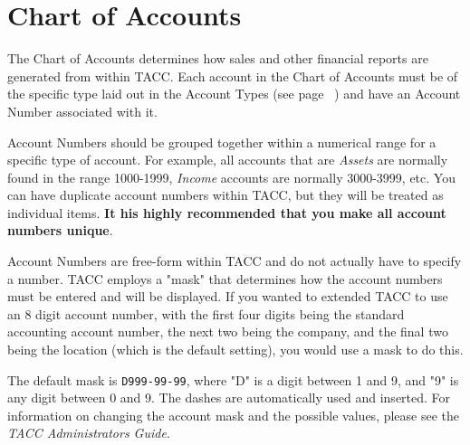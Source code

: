 \chapter{Chart of Accounts}
\label{Chart of Accounts}
The Chart of Accounts determines how sales and other financial reports
are generated from within TACC.  Each account in the Chart of Accounts
must be of the specific type laid out in the Account Types (see page
~\pageref{QuickStartAccountTypes}) and have an Account Number associated
with it.

Account Numbers should be grouped together within a numerical range for
a specific type of account.  For example, all accounts that are
\emph{Assets} are normally found in the range 1000-1999, \emph{Income}
accounts are normally 3000-3999, etc.  You can have duplicate account
numbers within TACC, but they will be treated as individual items.
{\bf It his highly recommended that you make all account numbers unique}.

Account Numbers are free-form within TACC and do not actually have to
specify a number.  TACC employs a "mask" that determines how the account
numbers must be entered and will be displayed.  If you wanted to
extended TACC to use an 8 digit account number, with the first four
digits being the standard accounting account number, the next two being
the company, and the final two being the location (which is the default
setting), you would use a mask to do this.

The default mask is {\tt D999-99-99}, where "D" is a digit between 1 and 9,
and "9" is any digit between 0 and 9.  The dashes are automatically used
and inserted.  For information on changing the account mask and the
possible values, please see the {\it TACC Administrators Guide}.

